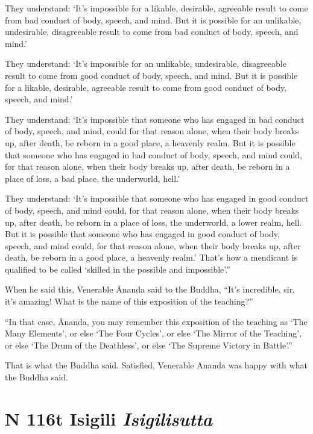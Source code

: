 \documentclass[12pt,openany]{book}%
\newcommand*{\suttatitleacronym}[1]{\smaller[2]{#1}\vspace*{.3em}}
\newcommand*{\suttatitletranslation}[1]{\linebreak{#1}}
\newcommand*{\suttatitleroot}[1]{\linebreak\smaller[2]\itshape{#1}}
\newcommand*{\tocacronym}[1]{\hspace*{-3.3em}{#1}\quad}
\newcommand*{\toctranslation}[1]{#1}
\newcommand*{\tocroot}[1]{(\textit{#1})}
\begin{document}
They understand: ‘It’s impossible for a likable, desirable, agreeable result to come from bad conduct of body, speech, and mind. But it is possible for an unlikable, undesirable, disagreeable result to come from bad conduct of body, speech, and mind.’ 

They understand: ‘It’s impossible for an unlikable, undesirable, disagreeable result to come from good conduct of body, speech, and mind. But it is possible for a likable, desirable, agreeable result to come from good conduct of body, speech, and mind.’ 

They understand: ‘It’s impossible that someone who has engaged in bad conduct of body, speech, and mind, could for that reason alone, when their body breaks up, after death, be reborn in a good place, a heavenly realm. But it is possible that someone who has engaged in bad conduct of body, speech, and mind could, for that reason alone, when their body breaks up, after death, be reborn in a place of loss, a bad place, the underworld, hell.’ 

They understand: ‘It’s impossible that someone who has engaged in good conduct of body, speech, and mind could, for that reason alone, when their body breaks up, after death, be reborn in a place of loss, the underworld, a lower realm, hell. But it is possible that someone who has engaged in good conduct of body, speech, and mind could, for that reason alone, when their body breaks up, after death, be reborn in a good place, a heavenly realm.’ That’s how a mendicant is qualified to be called ‘skilled in the possible and impossible’.” 

When he said this, Venerable Ānanda said to the Buddha, “It’s incredible, sir, it’s amazing! What is the name of this exposition of the teaching?” 

“In that case, Ānanda, you may remember this exposition of the teaching as ‘The Many Elements’, or else ‘The Four Cycles’, or else ‘The Mirror of the Teaching’, or else ‘The Drum of the Deathless’, or else ‘The Supreme Victory in Battle’.” 

That is what the Buddha said. Satisfied, Venerable Ānanda was happy with what the Buddha said. 

%
\section*{{\suttatitleacronym MN 116}{\suttatitletranslation At Isigili }{\suttatitleroot Isigilisutta}}
\addcontentsline{toc}{section}{\tocacronym{MN 116} \toctranslation{At Isigili } \tocroot{Isigilisutta}}
\end{document}
